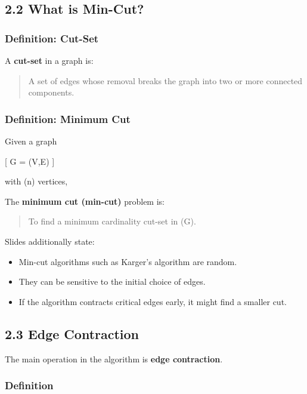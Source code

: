 \documentclass[12pt]{article}
\begin{document}
\bigskip

\subsection*{2.2 What is Min-Cut?}

\subsubsection*{Definition: Cut-Set}

A \textbf{cut-set} in a graph is:

\begin{quote}
A set of edges whose removal breaks the graph into two or more connected components.
\end{quote}

\bigskip

\subsubsection*{Definition: Minimum Cut}

Given a graph

[
G = (V,E)
]

with (n) vertices,

The \textbf{minimum cut (min-cut)} problem is:

\begin{quote}
To find a minimum cardinality cut-set in (G).
\end{quote}

Slides additionally state:

\begin{itemize}
\item Min-cut algorithms such as Karger’s algorithm are random.
\item They can be sensitive to the initial choice of edges.
\item If the algorithm contracts critical edges early, it might find a smaller cut.
\end{itemize}

\bigskip

\subsection*{2.3 Edge Contraction}

The main operation in the algorithm is \textbf{edge contraction}.

\subsubsection*{Definition}
\end{document}
